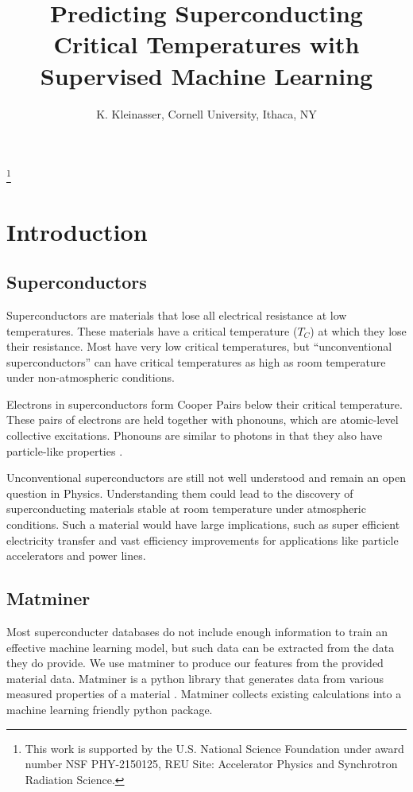 \documentclass[twocolumn, nofootinbib, secnumarabic, amssymb, nobibnotes, aps, prd]{revtex4-2}
\begin{document}
\title{Predicting Superconducting Critical Temperatures with Supervised Machine Learning}\thanks{This work is supported by the U.S. National Science Foundation under award number NSF PHY-2150125, REU Site: Accelerator Physics and Synchrotron Radiation Science.}

\author{K. Kleinasser, Cornell University, Ithaca, NY}

\maketitle
\tableofcontents

\section{Introduction}
\subsection{Superconductors}
Superconductors are materials that lose all electrical resistance at low temperatures. These materials have a critical temperature ($T_C$) at which they lose their resistance. Most have very low critical temperatures, but “unconventional superconductors” can have critical temperatures as high as room temperature under non-atmospheric conditions. 

Electrons in superconductors form Cooper Pairs below their critical temperature. These pairs of electrons are held together with phonouns, which are atomic-level collective excitations. Phonouns are similar to photons in that they also have particle-like properties \cite{rohlf_1994}.

Unconventional superconductors are still not well understood and remain an open question in Physics. Understanding them could lead to the discovery of superconducting materials stable at room temperature under atmospheric conditions. Such a material would have large implications, such as super efficient electricity transfer and vast efficiency improvements for applications like particle accelerators and power lines.


\subsection{Matminer}
Most superconducter databases do not include enough information to train an effective machine learning model, but such data can be extracted from the data they do provide. We use matminer to produce our features from the provided material data. Matminer is a python library that generates data from various measured properties of a material \cite{WARD201860}. Matminer collects existing calculations into a machine learning friendly python package. %
\end{document}
